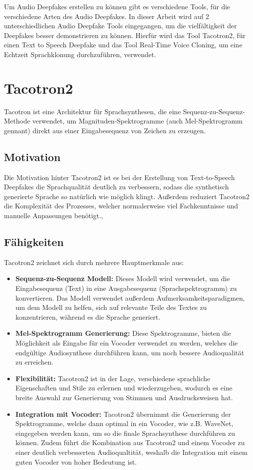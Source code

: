 Um Audio Deepfakes erstellen zu können gibt es verschiedene Tools, für die verschiedene Arten des Audio Deepfakes.
In dieser Arbeit wird auf 2 unterschiedlichen Audio Deepfake Tools eingegangen, um die vielfältigkeit der Deepfakes besser demonstrieren zu können.
Hierfür wird das Tool Tacotron2, für einen Text to Speech Deepfake und das Tool Real-Time Voice Cloning, um eine Echtzeit Sprachklonung durchzuführen, verwendet.

\section{Tacotron2}
Tacotron ist eine Architektur für Sprachsynthesen, die eine \gls{Sequenz-zu-Sequenz-Methode} verwendet, um \gls{Magnituden-Spektrogramme} (auch Mel-Spektrogramm gennant) direkt aus einer Eingabesequenz von Zeichen zu erzeugen.

\subsection{Motivation}
Die Motivation hinter Tacotron2 ist es bei der Erstellung von Text-to-Speech Deepfakes die Sprachqualität deutlich zu verbessern, sodass die synthetisch generierte Sprache so natürlich wie möglich klingt.
Außerdem reduziert Tacotron2 die Komplexität des Prozesses, welcher normalerweise viel Fachkenntnisse und manuelle Anpassungen benötigt.\cite{Arxiv},\cite{Arxiv2}

\subsection{Fähigkeiten}
Tacotron2 zeichnet sich durch mehrere Hauptmerkmale aus:
\begin{itemize}
    \item \textbf{Sequenz-zu-Sequenz Modell:} Dieses Modell wird verwendet, um die Eingabesequenz (Text) in eine Ausgabesequenz (Sprachspektrogramm) zu konvertieren. Das Modell verwendet außerdem Aufmerksamkeitsparadigmen, um dem Modell zu helfen, sich auf relevante Teile des Textes zu konzentrieren, während es die Sprache generiert.\cite{Arxiv2}
    \item \textbf{Mel-Spektrogramm Generierung:} Diese Spektrogramme, bieten die Möglichkeit als Eingabe für ein Vocoder verwendet zu werden, welches die endgültige Audiosynthese durchführen kann, um noch bessere Audioqualität zu erreichen.\cite{Arxiv}
    \item \textbf{Flexibilität:} Tacotron2 ist in der Lage, verschiedene sprachliche Eigenschaften und Stile zu erlernen und wiederzugeben, wodurch es eine breite Auswahl zur Generierung von Stimmen und Ausdrucksweisen hat.\cite{Arxiv}
    \item \textbf{Integration mit Vocoder:} Tacotron2 übernimmt die Generierung der Spektrogramme, welche dann optimal in ein Vocoder, wie z.B. WaveNet, eingegeben werden kann, um so die finale Sprachsynthese durchführen zu können. Zudem führt die Kombination aus Tacotron2 und einem Vocoder zu einer deutlich verbesserten Audioqualtität, weshalb die Integration mit einem guten Vocoder von hoher Bedeutung ist. \cite{Arxiv}
\end{itemize}

